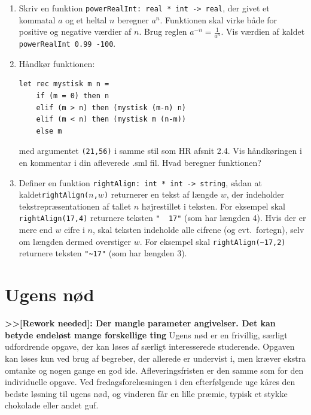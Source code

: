 \documentclass[a4paper,12pt]{article}
\begin{document}
\begin{enumerate}[{1I}1]
\item Skriv en funktion \verb|powerRealInt: real * int -> real|,
  der givet et kommatal $a$ og et heltal $n$ beregner $a^n$. Funktionen
  skal virke både for positive og negative værdier af $n$. Brug reglen
  $a^{-n} = \frac{1}{a^n}$. Vis værdien af kaldet %
  \verb|powerRealInt 0.99 -100|.

\item Håndkør funktionen:

\begin{verbatim}
let rec mystisk m n =
    if (m = 0) then n 
    elif (m > n) then (mystisk (m-n) n)
    elif (m < n) then (mystisk m (n-m))
    else m
\end{verbatim}

med argumentet \verb|(21,56)| i samme stil som HR afsnit 2.4.
Vis håndkøringen i en kommentar i din afleverede .sml fil. Hvad beregner funktionen?

\item Definer en funktion \verb|rightAlign: int * int -> string|,
  sådan at kaldet\newline \texttt{rightAlign($n$,$w$)} returnerer en
  tekst af længde $w$, der indeholder tekstrepræsentationen af tallet
  $n$ højrestillet i teksten.  For eksempel skal
  \texttt{rightAlign(17,4)} returnere teksten \texttt{"{}~~17"} (som
  har længden 4).  Hvis der er mere end $w$ cifre i $n$, skal teksten
  indeholde alle cifrene (og evt.\ fortegn), selv om længden dermed
  overstiger $w$.  For eksempel skal \verb|rightAlign(~17,2)|
  returnere teksten \verb|"~17"| (som har længden 3).

\end{enumerate}

\section{Ugens nød}
\label{sec:ugens-nod}

\textbf{>>[Rework needed]: Der mangle parameter angivelser. Det kan betyde endeløst mange forskellige ting}
Ugens nød er en frivillig, særligt udfordrende opgave, der kan løses
af særligt interesserede studerende.  Opgaven kan løses kun ved brug
af begreber, der allerede er undervist i, men kræver ekstra omtanke og
nogen gange en god ide.  Afleveringsfristen er den samme som for den
individuelle opgave.  Ved fredagsforelæsningen i den efterfølgende uge
kåres den bedste løsning til ugens nød, og vinderen får en lille
præmie, typisk et stykke chokolade eller andet guf.
\end{document}
